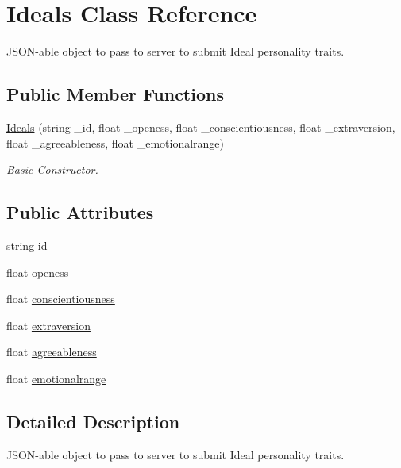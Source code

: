 \hypertarget{class_ideals}{}\section{Ideals Class Reference}
\label{class_ideals}


J\+S\+O\+N-\/able object to pass to server to submit Ideal personality traits.  


\subsection*{Public Member Functions}
\begin{DoxyCompactItemize}
\item 
\mbox{\hyperlink{class_ideals_abd4643b2fa3716e9481f924e5bf5fff3}{Ideals}} (string \+\_\+id, float \+\_\+openess, float \+\_\+conscientiousness, float \+\_\+extraversion, float \+\_\+agreeableness, float \+\_\+emotionalrange)
\begin{DoxyCompactList}\small\item\em Basic Constructor. \end{DoxyCompactList}\end{DoxyCompactItemize}
\subsection*{Public Attributes}
\begin{DoxyCompactItemize}
\item 
string \mbox{\hyperlink{class_ideals_a29f7b5096a6864440086554867f3e12c}{id}}
\item 
float \mbox{\hyperlink{class_ideals_a648763f2b5d91dda9358164ee1756274}{openess}}
\item 
float \mbox{\hyperlink{class_ideals_ab111253ba1026e09b2a87b2b0accaee8}{conscientiousness}}
\item 
float \mbox{\hyperlink{class_ideals_ad5b55c25cbf73153ea017d8ed3c708b2}{extraversion}}
\item 
float \mbox{\hyperlink{class_ideals_a392c9c4d471c383b7ed47eab5eff54ce}{agreeableness}}
\item 
float \mbox{\hyperlink{class_ideals_aaa63cb593d1e86816d23ee6321d59427}{emotionalrange}}
\end{DoxyCompactItemize}


\subsection{Detailed Description}
J\+S\+O\+N-\/able object to pass to server to submit Ideal personality traits. 

